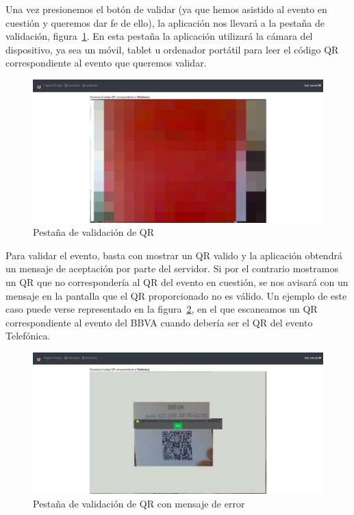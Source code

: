 \documentclass[a4paper, 12pt]{book}
\begin{document}
\begin{enumerate}
\begin{itemize}
	Una vez presionemos el botón de validar (ya que hemos asistido al evento en cuestión y queremos dar fe de ello), la aplicación nos llevará a la pestaña de validación, figura~\ref{fig:validarQR}.
	En esta pestaña la aplicación utilizará la cámara del dispositivo, ya sea un móvil, tablet u ordenador portátil para leer el código QR correspondiente al evento que queremos validar.
	\begin{figure}[h!]
  	\centering
  	\includegraphics[width=12cm, keepaspectratio]{img/validarQR.png}
  	\caption{Pestaña de validación de QR}\label{fig:validarQR}
	\end{figure}

Para validar el evento, basta con mostrar un QR valido y la aplicación obtendrá un mensaje de aceptación por parte del servidor. Si por el contrario mostramos un QR que no correspondería al QR del evento en cuestión, se nos avisará con un mensaje en la pantalla que el QR proporcionado no es válido. Un ejemplo de este caso puede verse representado en la figura~\ref{fig:validarQRFail}, en el que escaneamos un QR correspondiente al evento del BBVA cuando debería ser el QR del evento Telefónica.

	\begin{figure}[!h]
  	\centering
  	\includegraphics[width=12cm, keepaspectratio]{img/validarQRFail.png}
  	\caption{Pestaña de validación de QR con mensaje de error}\label{fig:validarQRFail}
	\end{figure}  
	

\end{itemize}
\end{enumerate}
\end{document}
